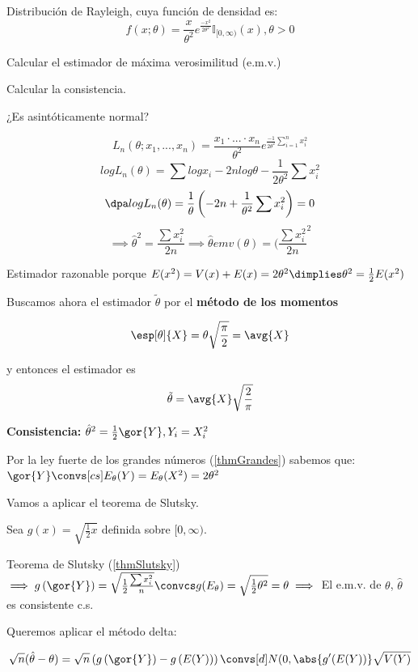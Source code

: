 \begin{problem}[5]
Distribución de Rayleigh, cuya función de densidad es:
\[f(x;\theta) = \frac{x}{\theta^2} e^{\frac{-x^2}{2\theta^2}} \mathbb{I}_{[0,\infty)} (x), \theta > 0\]

\ppart Calcular el estimador de máxima verosimilitud (e.m.v.)

\ppart Calcular la consistencia.

\ppart ¿Es asintóticamente normal?

\solution

\spart

\[L_n(\theta;x_1,...,x_n) = \frac{x_1 \cdot ... \cdot x_n}{\theta^2} e^{\frac{-1}{2\theta^2} \sum_{i=1}^n x_i^2}\]
\[log L_n(\theta) = \sum log x_i - 2nlog\theta -\frac{1}{2\theta^2}\sum x_i^2\]
\[\dpa log L_n(\theta) = \frac{1}{\theta} \left(-2n+\frac{1}{\theta^2}\sum x_i^2\right) = 0\]
\[\implies \hat{\theta}^2 = \frac{\sum x_i^2}{2n} \implies \hat{\theta} emv(\theta) = (\frac{\sum x_i^2}{2n}^2\]

Estimador razonable porque $E(x^2) = V(x) + E(x) = 2\theta^2 \dimplies \theta^2 = \frac{1}{2} E(x^2)$

Buscamos ahora el estimador $\tilde\theta$ por el \textbf{método de los momentos}

\[ \esp[\theta]{X}= \theta\sqrt{\frac{\pi}{2}} = \avg{X} \] 

y entonces el estimador es \[\tilde{\theta} = \avg{X}\sqrt{\frac{2}{\pi}} \]

\spart

\textbf{Consistencia:} $\hat{\theta}^2 = \frac{1}{2} \gor{Y}, Y_i = X_i^2$

Por la ley fuerte de los grandes números (\ref{thmGrandes}) sabemos que: $\gor{Y} \convs[cs] E_{\theta}(Y) = E_{\theta}(X^2) = 2\theta^2$

Vamos a aplicar el teorema de Slutsky.

Sea $g(x) = \sqrt{\frac{1}{2}x}$ definida sobre $[0,\infty)$.

Teorema de Slutsky (\ref{thmSlutsky}) $\implies g\left(\gor{Y}\right) = \sqrt{\frac{1}{2} \frac{\sum x_i^2}{n}} \convcs g(E_{\theta}) = \sqrt{\frac{1}{2}\theta^2} = \theta \implies $ El e.m.v. de $\theta$, $\hat{\theta}$ es consistente c.s.


\spart

Queremos aplicar el método delta:

\[\sqrt{n}(\hat{\theta} - \theta) = \sqrt{n}\left(g\left(\gor{Y}\right) - g\left(E(Y)\right)\right) \convs[d]N(0,\abs{g'(E(Y))}\sqrt{V(Y)}\]


\end{problem}

